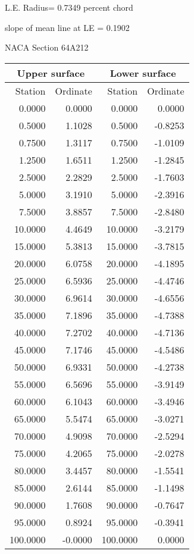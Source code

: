 \documentclass[11pt]{book}
\begin{document}
L.E. Radius=  0.7349 percent chord


 slope of mean line at LE =  0.1902
 \newpage
  \label{s64A212}
 \begin{Large}
 NACA Section 64A212
 \end{Large}
  
 \vspace{8mm}
 \begin{tabular}{|r|r|r|r|} \hline 
 \multicolumn{2}{|c|}{Upper surface} & \multicolumn{2}{|c|}{Lower surface} \\
 \hline
 Station & Ordinate & Station & Ordinate \\
 \hline
0.0000 & 0.0000 & 0.0000 & 0.0000 \\
0.5000 & 1.1028 & 0.5000 & -0.8253 \\
0.7500 & 1.3117 & 0.7500 & -1.0109 \\
1.2500 & 1.6511 & 1.2500 & -1.2845 \\
2.5000 & 2.2829 & 2.5000 & -1.7603 \\
5.0000 & 3.1910 & 5.0000 & -2.3916 \\
7.5000 & 3.8857 & 7.5000 & -2.8480 \\
10.0000 & 4.4649 & 10.0000 & -3.2179 \\
15.0000 & 5.3813 & 15.0000 & -3.7815 \\
20.0000 & 6.0758 & 20.0000 & -4.1895 \\
25.0000 & 6.5936 & 25.0000 & -4.4746 \\
30.0000 & 6.9614 & 30.0000 & -4.6556 \\
35.0000 & 7.1896 & 35.0000 & -4.7388 \\
40.0000 & 7.2702 & 40.0000 & -4.7136 \\
45.0000 & 7.1746 & 45.0000 & -4.5486 \\
50.0000 & 6.9331 & 50.0000 & -4.2738 \\
55.0000 & 6.5696 & 55.0000 & -3.9149 \\
60.0000 & 6.1043 & 60.0000 & -3.4946 \\
65.0000 & 5.5474 & 65.0000 & -3.0271 \\
70.0000 & 4.9098 & 70.0000 & -2.5294 \\
75.0000 & 4.2065 & 75.0000 & -2.0278 \\
80.0000 & 3.4457 & 80.0000 & -1.5541 \\
85.0000 & 2.6144 & 85.0000 & -1.1498 \\
90.0000 & 1.7608 & 90.0000 & -0.7647 \\
95.0000 & 0.8924 & 95.0000 & -0.3941 \\
100.0000 & -0.0000 & 100.0000 & 0.0000 \\
 \hline 
 \end{tabular}
\end{document}
